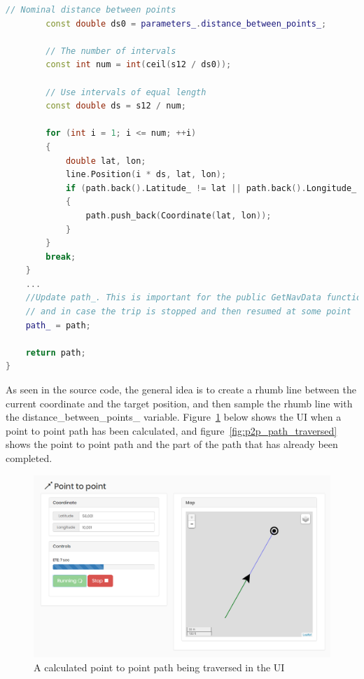 \begin{lstlisting}[caption = {Function responsible for calculating a P2P path}, captionpos=b, label={lst:calculateP2PPath}, language=C++,firstnumber=1]
		// Nominal distance between points
		const double ds0 = parameters_.distance_between_points_;

		// The number of intervals
		const int num = int(ceil(s12 / ds0));

		// Use intervals of equal length
		const double ds = s12 / num;

		for (int i = 1; i <= num; ++i)
		{
			double lat, lon;
			line.Position(i * ds, lat, lon);
			if (path.back().Latitude_ != lat || path.back().Longitude_ != lon) //Check for duplicates
			{
				path.push_back(Coordinate(lat, lon));
			}
		}
		break;
	}
	...
	//Update path_. This is important for the public GetNavData function,
	// and in case the trip is stopped and then resumed at some point
	path_ = path;
	
	return path;
}
\end{lstlisting}

As seen in the source code, the general idea is to create a rhumb line between the current coordinate and the target position, and then sample the rhumb line with the distance_between_points_ variable. Figure~\ref{fig:p2p_path} below shows the UI when a point to point path has been calculated, and figure~\ref{fig:p2p_path_traversed} shows the point to point path and the part of the path that has already been completed.

\begin{figure}[H]
\centering
\includegraphics[max width=0.9\linewidth]{Images/Implementation/P2P_path_being_traversed}
\caption{A calculated point to point path being traversed in the UI}
\label{fig:p2p_path}
\end{figure}

